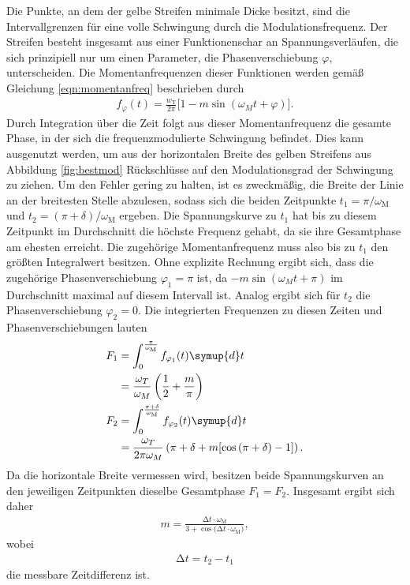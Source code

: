 Die Punkte, an dem der gelbe Streifen minimale Dicke besitzt, sind die
Intervallgrenzen für eine volle Schwingung durch die Modulationsfrequenz. Der Streifen besteht insgesamt aus
einer Funktionenschar an Spannungsverläufen, die sich prinzipiell nur um einen Parameter, die Phasenverschiebung $\varphi$,
unterscheiden. Die Momentanfrequenzen dieser Funktionen werden gemäß Gleichung \eqref{eqn:momentanfreq} beschrieben durch
\begin{align}
  f_{\varphi}(t) = \frac{w_\text{T}}{2 \pi} \bigl[1 - m \sin{(\omega_M t + \varphi)}\bigr].
\end{align}
Durch Integration über die Zeit folgt aus dieser Momentanfrequenz die gesamte Phase, in der sich die frequenzmodulierte
Schwingung befindet. Dies kann ausgenutzt werden, um aus der horizontalen Breite des gelben Streifens aus Abbildung \ref{fig:bestmod}
Rückschlüsse auf den Modulationsgrad der Schwingung zu ziehen. Um den Fehler gering zu halten, ist es zweckmäßig,
die Breite der Linie an der breitesten Stelle abzulesen, sodass sich die beiden Zeitpunkte $t_1 = \pi/\omega_\text{M}$
und $t_2 = (\pi + \delta)/\omega_\text{M}$ ergeben. Die Spannungskurve zu $t_1$ hat bis zu diesem
Zeitpunkt im Durchschnitt die höchste Frequenz gehabt, da sie ihre Gesamtphase am ehesten erreicht. Die zugehörige Momentanfrequenz
muss also bis zu $t_1$ den größten Integralwert besitzen. Ohne explizite Rechnung ergibt sich, dass die zugehörige
Phasenverschiebung $\varphi_1 = \pi$ ist, da $-m\sin{(\omega_M t + \pi)}$ im Durchschnitt maximal auf diesem Intervall ist.
Analog ergibt sich für $t_2$ die Phasenverschiebung $\varphi_2 = 0$. Die integrierten Frequenzen zu diesen Zeiten und Phasenverschiebungen lauten
\begin{align}
  F_1 &= \int_{0}^{\frac{\pi}{\omega_\text{M}}} f_{\varphi_1}(t) \symup{d}t \\
  &= \frac{\omega_T}{\omega_M} \left( \frac12 + \frac{m}{\pi} \right) \\
  F_2 &= \int_{0}^{\frac{\pi+\delta}{\omega_\text{M}}} f_{\varphi_2}(t) \symup{d}t \\
  &= \frac{\omega_T}{2 \pi \omega_M} \left( \pi + \delta + m[\cos{(\pi + \delta)} - 1] \right).
\end{align}
Da die horizontale Breite vermessen wird, besitzen beide Spannungskurven an den jeweiligen Zeitpunkten dieselbe Gesamtphase $F_1 = F_2$.
Insgesamt ergibt sich daher
\begin{align}
  m = \frac{\mathrm{\increment} t \cdot \omega_\text{M}}{3 + \cos{(\increment t \cdot \omega_\text{M}})},
  \label{eqn:mfuerfreqmod}
\end{align}
wobei
\begin{align}
  \increment t = t_2 - t_1
\end{align}
die messbare Zeitdifferenz ist.
